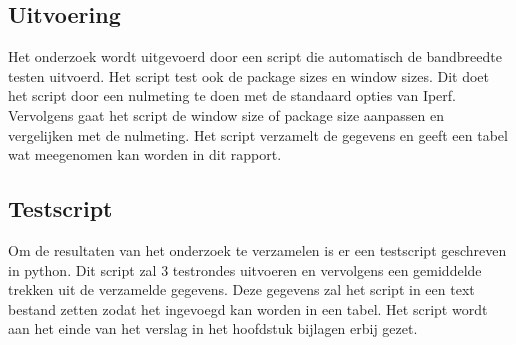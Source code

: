 \documentclass[../DCM2_Verslag.tex]{subfiles}
\begin{document}
\subsection{Uitvoering}
Het onderzoek wordt uitgevoerd door een script die automatisch de bandbreedte testen uitvoerd. Het script test ook de package sizes en window sizes. Dit doet het script door een nulmeting te doen met de standaard opties van Iperf. Vervolgens gaat het script de window size of package size aanpassen en vergelijken met de nulmeting. Het script verzamelt de gegevens en geeft een tabel wat meegenomen kan worden in dit rapport.

\subsection{Testscript}
Om de resultaten van het onderzoek te verzamelen is er een testscript geschreven in python. Dit script zal 3 testrondes uitvoeren en vervolgens een gemiddelde trekken uit de verzamelde gegevens.
Deze gegevens zal het script in een text bestand zetten zodat het ingevoegd kan worden in een tabel. Het script wordt aan het einde van het verslag in het hoofdstuk bijlagen erbij gezet.
\end{document}
